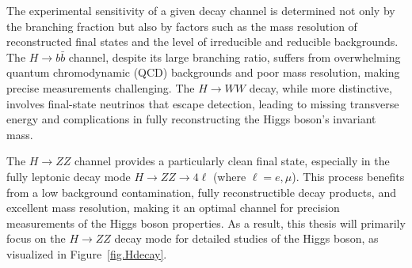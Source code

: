 The experimental sensitivity of a given decay channel is determined not only by the branching fraction but also by factors such as the mass resolution of reconstructed final states and the level of irreducible and reducible backgrounds. The \( H \to b\bar{b} \) channel, despite its large branching ratio, suffers from overwhelming quantum chromodynamic (QCD) backgrounds and poor mass resolution, making precise measurements challenging. The \( H \to WW \) decay, while more distinctive, involves final-state neutrinos that escape detection, leading to missing transverse energy and complications in fully reconstructing the Higgs boson's invariant mass.

The \( H \to ZZ \) channel provides a particularly clean final state, especially in the fully leptonic decay mode \( H \to ZZ \to 4\ell \) (where \( \ell = e, \mu \)). This process benefits from a low background contamination, fully reconstructible decay products, and excellent mass resolution, making it an optimal channel for precision measurements of the Higgs boson properties. As a result, this thesis will primarily focus on the \( H \to ZZ \) decay mode for detailed studies of the Higgs boson, as visualized in Figure~\ref{fig.Hdecay}.



